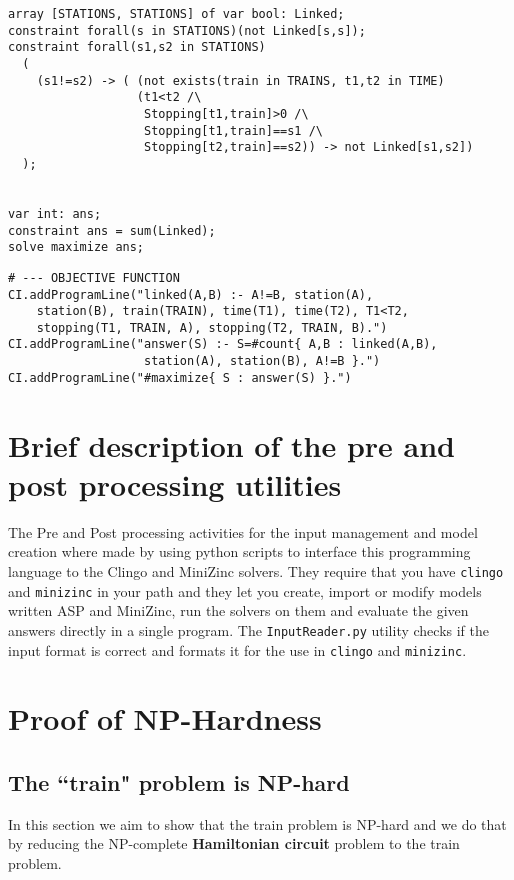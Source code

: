\documentclass[11pt]{article}
\begin{document}
\begin{verbatim}
array [STATIONS, STATIONS] of var bool: Linked;
constraint forall(s in STATIONS)(not Linked[s,s]);
constraint forall(s1,s2 in STATIONS)
  (
    (s1!=s2) -> ( (not exists(train in TRAINS, t1,t2 in TIME)
                  (t1<t2 /\
                   Stopping[t1,train]>0 /\
                   Stopping[t1,train]==s1 /\ 
                   Stopping[t2,train]==s2)) -> not Linked[s1,s2])
  );


var int: ans;
constraint ans = sum(Linked);
solve maximize ans;
\end{verbatim}

\begin{verbatim}
# --- OBJECTIVE FUNCTION
CI.addProgramLine("linked(A,B) :- A!=B, station(A),
    station(B), train(TRAIN), time(T1), time(T2), T1<T2,
    stopping(T1, TRAIN, A), stopping(T2, TRAIN, B).")
CI.addProgramLine("answer(S) :- S=#count{ A,B : linked(A,B),
                   station(A), station(B), A!=B }.")
CI.addProgramLine("#maximize{ S : answer(S) }.")
\end{verbatim}

\section{Brief description of the pre and post processing utilities}

The Pre and Post processing activities for the input management and model creation where made by using python scripts to interface this
programming language to the Clingo and MiniZinc solvers. They require that you have \verb+clingo+ and \verb+minizinc+ in your path
and they let you create, import or modify models written ASP and MiniZinc, run the solvers on them and evaluate the given answers
directly in a single program. The \verb+InputReader.py+ utility checks if the input format is correct and formats it for the use in 
\verb+clingo+ and \verb+minizinc+.

\section{Proof of NP-Hardness}
\subsection{The ``train" problem is NP-hard}

In this section we aim to show that the train problem is NP-hard and we do that by reducing the NP-complete \textbf{Hamiltonian circuit} problem to the train problem.
\end{document}
